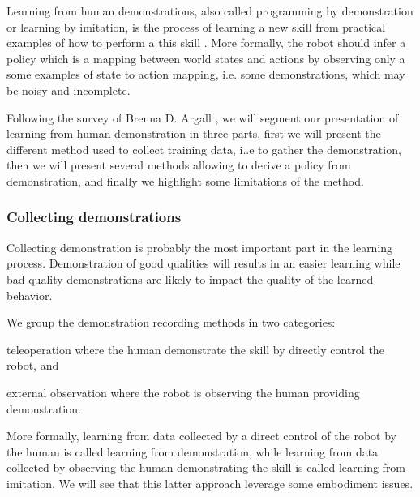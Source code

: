 Learning from human demonstrations, also called programming by demonstration or learning by imitation, is the process of learning a new skill from practical examples of how to perform a this skill \cite{schaal1999imitation,calinon2008robot,argall09survey,lopes10imitationchapter}. More formally, the robot should infer a policy which is a mapping between world states and actions by observing only a  some examples of state to action mapping, i.e. some demonstrations, which may be noisy and incomplete.

Following the survey of Brenna D. Argall \cite{argall09survey}, we will segment our presentation of learning from human demonstration in three parts, first we will present the different method used to collect training data, i..e to gather the demonstration, then we will present several methods allowing to derive a policy from demonstration, and finally we highlight some limitations of the method.


\subsubsection*{Collecting demonstrations}

Collecting demonstration is probably the most important part in the learning process. Demonstration of good qualities will results in an easier learning while bad quality demonstrations are likely to impact the quality of the learned behavior.

We group the demonstration recording methods in two categories: \begin{inparaenum} \item teleoperation where the human demonstrate the skill by directly control the robot, and \item external observation where the robot is observing the human providing demonstration. \end{inparaenum} More formally, learning from data collected by a direct control of the robot by the human is called learning from demonstration, while learning from data collected by observing the human demonstrating the skill is called learning from imitation. We will see that this latter approach leverage some embodiment issues.

